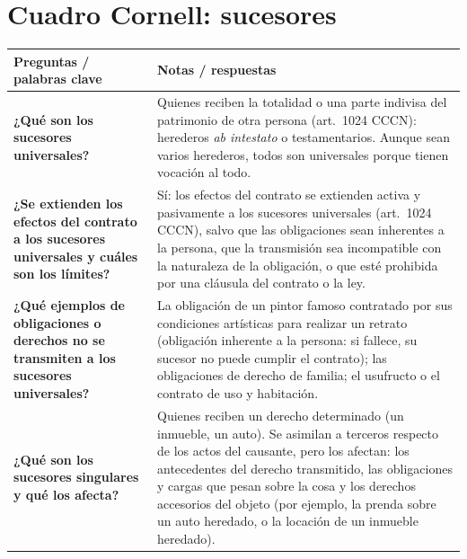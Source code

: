 \documentclass[12pt,oneside]{book}
\begin{document}
\section{Cuadro Cornell: sucesores}

\begin{table}[H]
\centering
\small
\renewcommand{\arraystretch}{1.3}
\begin{tabularx}{\textwidth}{
    >{\raggedright\arraybackslash}p{}
    >{\raggedright\arraybackslash}X
}
\toprule
\textbf{Preguntas / palabras clave} &
\textbf{Notas / respuestas} \\
\midrule

\textbf{¿Qué son los sucesores universales?} &
Quienes reciben la totalidad o una parte indivisa del patrimonio de otra persona (art.~1024 CCCN): herederos \textit{ab intestato} o testamentarios. Aunque sean varios herederos, todos son universales porque tienen vocación al todo. \\

\midrule

\textbf{¿Se extienden los efectos del contrato a los sucesores universales y cuáles son los límites?} &
Sí: los efectos del contrato se extienden activa y pasivamente a los sucesores universales (art.~1024 CCCN), salvo que las obligaciones sean inherentes a la persona, que la transmisión sea incompatible con la naturaleza de la obligación, o que esté prohibida por una cláusula del contrato o la ley. \\

\midrule

\textbf{¿Qué ejemplos de obligaciones o derechos no se transmiten a los sucesores universales?} &
La obligación de un pintor famoso contratado por sus condiciones artísticas para realizar un retrato (obligación inherente a la persona: si fallece, su sucesor no puede cumplir el contrato); las obligaciones de derecho de familia; el usufructo o el contrato de uso y habitación. \\

\midrule

\textbf{¿Qué son los sucesores singulares y qué los afecta?} &
Quienes reciben un derecho determinado (un inmueble, un auto). Se asimilan a terceros respecto de los actos del causante, pero los afectan: los antecedentes del derecho transmitido, las obligaciones y cargas que pesan sobre la cosa y los derechos accesorios del objeto (por ejemplo, la prenda sobre un auto heredado, o la locación de un inmueble heredado). \\


\end{tabularx}
\end{table}
\end{document}

